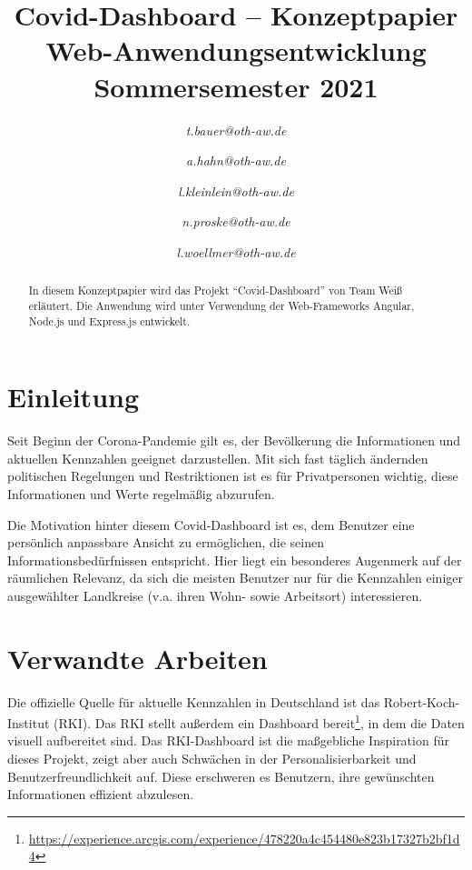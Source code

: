\documentclass[conference]{IEEEtran}
\begin{document}
\title{Covid-Dashboard -- Konzeptpapier\\
{\footnotesize Web-Anwendungsentwicklung Sommersemester 2021}}
\author{
\textit{t.bauer@oth-aw.de}
\and
{}
\textit{a.hahn@oth-aw.de}
\and
{}
\textit{l.kleinlein@oth-aw.de}
\and
{}
\textit{n.proske@oth-aw.de}
\and
{}
\textit{l.woellmer@oth-aw.de}
}

\maketitle

\begin{abstract}
    In diesem Konzeptpapier wird das Projekt "`Covid-Dashboard"' von Team Weiß erläutert. Die Anwendung wird unter Verwendung der Web-Frameworks Angular, Node.js und Express.js entwickelt.
\end{abstract}


\section{Einleitung}
Seit Beginn der Corona-Pandemie gilt es, der Bevölkerung die Informationen und aktuellen Kennzahlen geeignet darzustellen. Mit sich fast täglich ändernden politischen Regelungen und Restriktionen ist es für Privatpersonen wichtig, diese Informationen und Werte regelmäßig abzurufen.

Die Motivation hinter diesem Covid-Dashboard ist es, dem Benutzer eine persönlich anpassbare Ansicht zu ermöglichen, die seinen Informationsbedürfnissen entspricht. Hier liegt ein besonderes Augenmerk auf der räumlichen Relevanz, da sich die meisten Benutzer nur für die Kennzahlen einiger ausgewählter Landkreise (v.a. ihren Wohn- sowie Arbeitsort) interessieren.

\section{Verwandte Arbeiten}
Die offizielle Quelle für aktuelle Kennzahlen in Deutschland ist das Robert-Koch-Institut (RKI). Das RKI stellt außerdem ein Dashboard bereit\footnote{\url{https://experience.arcgis.com/experience/478220a4c454480e823b17327b2bf1d4}}, in dem die Daten visuell aufbereitet sind. Das RKI-Dashboard ist die maßgebliche Inspiration für dieses Projekt, zeigt aber auch Schwächen in der Personalisierbarkeit und Benutzerfreundlichkeit auf. Diese erschweren es Benutzern, ihre gewünschten Informationen effizient abzulesen.
\end{document}
